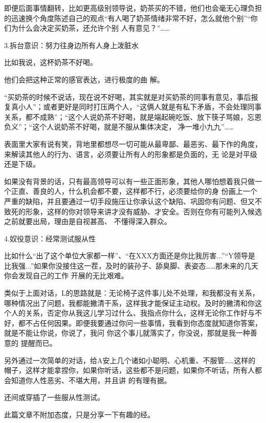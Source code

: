 \documentclass{article}
\begin{document}
即便后面事情翻转，比如更高级别领导说，奶茶买的不错，他们也会毫无心理负担的迅速换个角度陈述自己的观点“有人喝了奶茶情绪非常不好，怎么就他个别”“你们为什么会决定买奶茶，还允许个别
人有意见？”…… 

3.拆台意识：努力往身边所有人身上泼脏水

\newpage


比如我说，这杯奶茶不好喝。 

他们会把这种正常的感官表达，进行极度的曲
解。 

“买奶茶的时候不说话，现在说不好喝，其实就是对买奶茶的同事有意见，事后报复真小人”；或者更好是同时打压两个人，“这俩人就是有私下矛盾，不会处理同事关系，都不成熟”；“这个人说奶茶不好喝，就是端起碗吃饭、放下筷子骂娘，忘恩负义”；“这个人说奶茶不好喝，就是不服从集体决定，
净一堆小九九”…… 

表面里大家有说有笑，背地里都想尽一切可能从最卑鄙、最恶劣、最下作的角度，来解读其他人的行为、语言，必须要让所有人的形象都是负面的，无
论是对平级还是下级。 

如果没有背景的话，只有最高领导可以有一些正面形象，其他人哪怕想着我只做一个正直、善良的人，什么机会都不要，这样都不行，必须要给你的身
\newpage
份画上一个严重的缺陷，并且要通过一切手段施压让你承认这个缺陷、巩固你有问题、但又不致死的形象，这样的你对领导来讲才没有威胁、才安全。否则在你有可能列入候选之前就要出局，理由是自视甚高、
不懂得深入群众。 


4.奴役意识：经常测试服从性 

比如什么“出了这个单位大家都一样”、“在XXX方面还是你比我厉害...”“Y领导是比我强...”如果你没接住这一茬，及时的装孙子、舔臭脚、表姿态……那未来的几天你会发现自己的工作
开展的无比艰难。 

类似于上面对话，L的思路就是：无论椅子这件事儿处不处理，和我都没有关系，哪种情况出了问题，我都能撇清干系，这样我才能保证主动权。及时的撇清和你这个人的关系，否定你从我这儿学习过什么、我指点你什么，这样无论你工作好与不好，都不占任何因果。即便我要通过你问一些事情，我看到你态度就知道你答案，就是不能让你说，你说了，我问
\newpage
你这个事儿就落实了，你没说，那就是我一种善意的
提醒而已。 

另外通过一次简单的对话，给A安上几个诸如小聪明、心机重、不服管……这样的帽子，这样才能拿捏你，如果你听话，这些都不是问题，如果你不听话，所有人都会知道你人性恶劣、不堪大用，并且讲
的有理有据。 


还间或穿插了一些服从性测试。 

此篇文章不附加态度，只是分享一下有趣的经。
\end{document}

